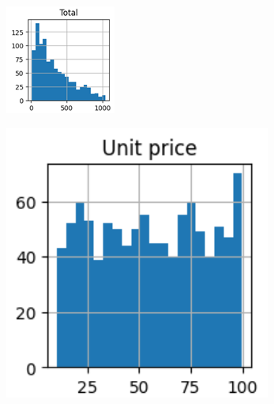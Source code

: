 \begin{figure}[h]
    \centering
    \begin{subfigure}[b]{0.2\textwidth}
        \includegraphics[width=\textwidth]{Chapters/ch1/n_dist_1.png}
    \end{subfigure}
    \hspace{0.05\textwidth} %
    \begin{subfigure}[b]{0.2\textwidth}
        \includegraphics[width=\textwidth]{Chapters/ch1/unit-price.png}

\end{subfigure}
\end{figure}
